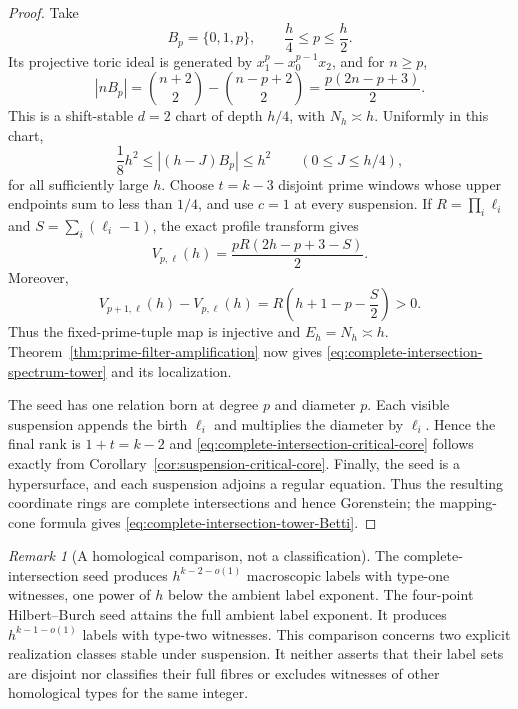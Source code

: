 \documentclass[11pt,reqno]{amsart}
\theoremstyle{definition}
\theoremstyle{remark}
\newtheorem{remark}[theorem]{Remark}
\begin{document}
\begin{proof}
Take
\[
 B_p=\{0,1,p\},\qquad \frac h4\leq p\leq\frac h2.
\]
Its projective toric ideal is generated by
$x_1^p-x_0^{p-1}x_2$, and for $n\geq p$,
\begin{equation}\label{eq:three-point-shift-stable-profile}
 |nB_p|=\binom{n+2}{2}-\binom{n-p+2}{2}
 =\frac{p(2n-p+3)}2.
\end{equation}
This is a shift-stable $d=2$ chart of depth $h/4$, with
$N_h\asymp h$.  Uniformly in this chart,
\begin{equation}\label{eq:three-point-macroscopic-chart}
 \frac18h^2\leq |(h-J)B_p|\leq h^2
 \qquad(0\leq J\leq h/4),
\end{equation}
for all sufficiently large $h$.  Choose $t=k-3$ disjoint
prime windows whose upper endpoints sum to less than $1/4$, and use $c=1$
at every suspension.  If $R=\prod_i\ell_i$ and
$S=\sum_i(\ell_i-1)$, the exact profile transform gives
\begin{equation}\label{eq:three-point-amplified-label}
 V_{p,\boldsymbol\ell}(h)
 =\frac{pR(2h-p+3-S)}2.
\end{equation}
Moreover,
\[
 V_{p+1,\boldsymbol\ell}(h)-V_{p,\boldsymbol\ell}(h)
 =R\left(h+1-p-\frac S2\right)>0.
\]
Thus the fixed-prime-tuple map is injective and $E_h=N_h\asymp h$.
Theorem~\ref{thm:prime-filter-amplification} now gives
\eqref{eq:complete-intersection-spectrum-tower} and its localization.

The seed has one relation born at degree $p$ and diameter $p$.  Each visible
suspension appends the birth $\ell_i$ and multiplies the diameter by
$\ell_i$.  Hence the final rank is $1+t=k-2$ and
\eqref{eq:complete-intersection-critical-core} follows exactly from
Corollary~\ref{cor:suspension-critical-core}.  Finally, the seed is a
hypersurface, and each suspension adjoins a regular equation.  Thus the
resulting coordinate rings are complete intersections and hence Gorenstein;
the mapping-cone formula gives
\eqref{eq:complete-intersection-tower-Betti}.
\end{proof}

\begin{remark}[A homological comparison, not a classification]
\label{rem:homological-comparison-hierarchy}
The complete-intersection seed produces
$h^{k-2-o(1)}$ macroscopic labels with type-one witnesses, one power of $h$
below the ambient label exponent.  The four-point Hilbert--Burch seed attains
the full ambient label exponent.  It produces $h^{k-1-o(1)}$ labels with
type-two witnesses.  This comparison concerns two explicit realization
classes stable under suspension.  It neither asserts that their label sets
are disjoint nor classifies their full fibres or excludes witnesses of other
homological types for the same integer.
\end{remark}
\end{document}
